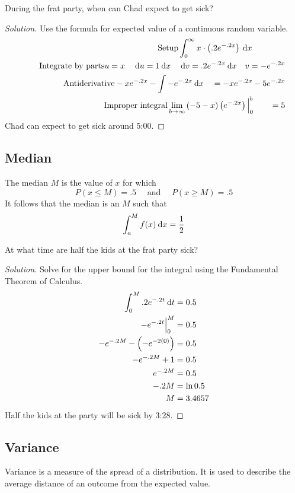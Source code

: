 \documentclass[11pt,leqno,letterpaper]{article}
\begin{document}
\begin{mdframed}
\begin{problem}
During the frat party, when can Chad expect to get sick?
\begin{proof}[Solution]
Use the formula for expected value of a continuous random variable.
\begin{align*}
\tag*{Setup}
\int_0^\infty x\cdot \left(.2e^{-.2x}\right)\:\mathrm{d}x \qquad \qquad \\
\tag*{Integrate by parts}
u=x \quad \:\mathrm{d}u = 1\:\mathrm{d}x \quad \:\mathrm{d}v = .2e^{-.2x}\:\mathrm{d}x \quad v = -e^{-.2x} \\
\tag*{Antiderivative}
-xe^{-.2x} - \int -e^{-.2x}\:\mathrm{d}x \quad = -xe^{-.2x} -5e^{-.2x} \\
\tag*{Improper integral}
\lim_{b\to \infty}\left(-5-x\right)\left(e^{-.2x}\right)\Big|_0^b
\qquad = 5
\end{align*}
Chad can expect to get sick around 5:00\AM{}.
\end{proof}
\end{problem}
\end{mdframed}
\subsection{Median}
The median $M$ is the value of $x$ for which
\[
P(x\leq M) = .5 \quad \text{ and } \quad P(x\geq M) = .5
\]
It follows that the median is an $M$ such that
\[
\int_a^M f(x) \:\mathrm{d}x = \frac{1}{2}
\]
\begin{mdframed}
\begin{problem}
At what time are half the kids at the frat party sick?
\begin{proof}[Solution]
Solve for the upper bound for the integral using
the Fundamental Theorem of Calculus.
\begin{align*}
\int_0^M .2e^{-.2t}\:\mathrm{d}t &= 0.5 \\
-e^{-.2t}\Big|_0^M &= 0.5 \\
-e^{-.2M}-\left(-e^{-2(0)}\right) &= 0.5 \\
-e^{-.2M} +1 &= 0.5 \\
e^{-.2M} &= 0.5 \\
-.2M &= \ln 0.5 \\
M &= 3.4657
\end{align*}
Half the kids at the party will be sick by 3:28\AM{}.
\end{proof}
\end{problem}
\end{mdframed}
\subsection{Variance}
Variance is a measure of the spread of a distribution.
It is used to describe the average distance of an outcome
from the expected value.
\end{document}
